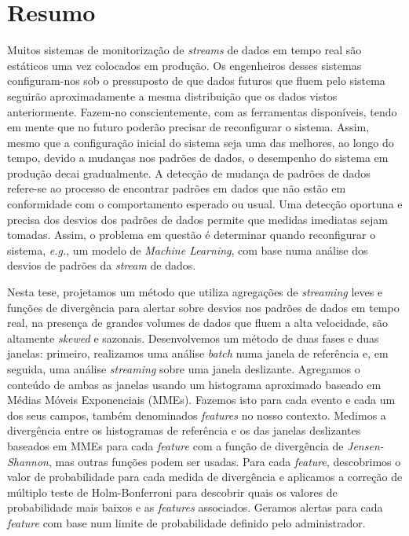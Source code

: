 \chapter*{Resumo}
Muitos sistemas de monitorização de \textit{streams} de dados em tempo real são estáticos uma vez colocados em produção. Os engenheiros desses sistemas configuram-nos sob o pressuposto de que dados futuros que fluem pelo sistema seguirão aproximadamente a mesma distribuição que os dados vistos anteriormente. Fazem-no conscientemente, com as ferramentas disponíveis, tendo em mente que no futuro poderão precisar de reconfigurar o sistema. Assim, mesmo que a configuração inicial do sistema seja uma das melhores, ao longo do tempo, devido a mudanças nos padrões de dados, o desempenho do sistema em produção decai gradualmente. A detecção de mudança de padrões de dados refere-se ao processo de encontrar padrões em dados que não estão em conformidade com o comportamento esperado ou usual. Uma detecção oportuna e precisa dos desvios dos padrões de dados permite que medidas imediatas sejam tomadas. Assim, o problema em questão é determinar quando reconfigurar o sistema, \textit{e.g.}, um modelo de \textit{Machine Learning}, com base numa análise dos desvios de padrões da \textit{stream} de dados.

Nesta tese, projetamos um método que utiliza agregações de \textit{streaming} leves e funções de divergência para alertar sobre desvios nos padrões de dados em tempo real, na presença de grandes volumes de dados que fluem a alta velocidade, são altamente \textit{skewed} e sazonais. Desenvolvemos um método de duas fases e duas janelas: primeiro, realizamos uma análise \textit{batch} numa janela de referência e, em seguida, uma análise \textit{streaming} sobre uma janela deslizante. Agregamos o conteúdo de ambas as janelas usando um histograma aproximado baseado em Médias Móveis Exponenciais (MMEs). Fazemos isto para cada evento e cada um dos seus campos, também denominados \textit{features} no nosso contexto. Medimos a divergência entre os histogramas de referência e os das janelas deslizantes baseados em MMEs para cada \textit{feature} com a função de divergência de \textit{Jensen-Shannon}, mas outras funções podem ser usadas. Para cada \textit{feature}, descobrimos o valor de probabilidade para cada medida de divergência e aplicamos a correção de múltiplo teste de Holm-Bonferroni para descobrir quais os valores de probabilidade mais baixos e as \textit{features} associados. Geramos alertas  para cada \textit{feature} com base num limite de probabilidade definido pelo administrador.

